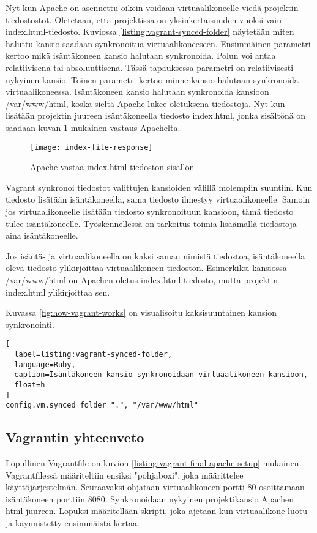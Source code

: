 Nyt kun Apache on asennettu oikein voidaan virtuaalikoneelle viedä projektin tiedostostot. Oletetaan, että projektissa on yksinkertaisuuden vuoksi vain index.html-tiedosto. Kuviossa \ref{listing:vagrant-synced-folder} näytetään miten haluttu kansio saadaan synkronoitua virtuaalikoneeseen. Ensimmäinen parametri kertoo mikä isäntäkoneen kansio halutaan synkronoida. Polun voi antaa relatiivisena tai absoluuttisena. Tässä tapauksessa parametri on relatiivisesti nykyinen kansio. Toinen parametri kertoo minne kansio halutaan synkronoida virtuaalikoneessa. Isäntäkoneen kansio halutaan synkronoida kansioon /var/www/html, koska sieltä Apache lukee oletuksena tiedostoja. Nyt kun lisätään projektin juureen isäntäkoneella tiedosto index.html, jonka sisältönä on  saadaan kuvan \ref{fig:index-file-response} mukainen vastaus Apachelta.

\begin{figure}[h]
  \texttt{[image: index-file-response]}
  \caption{Apache vastaa index.html tiedoston sisällön}
  \label{fig:index-file-response}
\end{figure}

Vagrant synkronoi tiedostot valittujen kansioiden välillä molempiin suuntiin. Kun tiedosto lisätään isäntäkoneella, sama tiedosto ilmestyy virtuaalikoneelle. Samoin jos virtuaalikoneelle lisätään tiedosto synkronoituun kansioon, tämä tiedosto tulee isäntäkoneelle. Työskennellessä on tarkoitus toimia lisäämällä tiedostoja aina isäntäkoneelle.


Jos isäntä- ja virtuaalikoneella on kaksi saman nimistä tiedostoa, isäntäkoneella oleva tiedosto ylikirjoittaa virtuaalikoneen tiedoston. Esimerkiksi kansiossa /var/www/html on Apachen oletus index.html-tiedosto, mutta projektin index.html ylikirjoittaa sen.

Kuvassa \ref{fig:how-vagrant-works} on visualisoitu kaksisuuntainen kansion synkronointi.

\begin{lstlisting}[
  label=listing:vagrant-synced-folder,
  language=Ruby,
  caption=Isäntäkoneen kansio synkronoidaan virtuaalikoneen kansioon,
  float=h
]
config.vm.synced_folder ".", "/var/www/html"
\end{lstlisting}

\subsection{Vagrantin yhteenveto}

Lopullinen Vagrantfile on kuvion \ref{listing:vagrant-final-apache-setup} mukainen. Vagrantfilessä määriteltiin ensiksi "pohjaboxi", joka määrittelee käyttöjärjestelmän. Seuraavaksi ohjataan virtuaalikoneen portti 80 osoittamaan isäntäkoneen porttiin 8080. Synkronoidaan nykyinen projektikansio Apachen html-juureen. Lopuksi määritellään skripti, joka ajetaan kun virtuaalikone luotu ja käynnistetty ensimmäistä kertaa.

